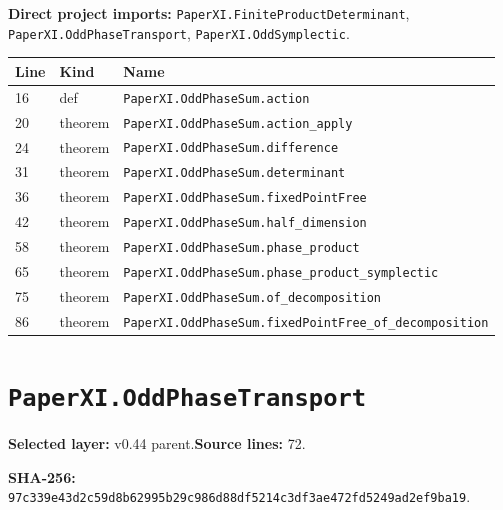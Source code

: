 \documentclass[10pt,oneside]{book}
\begin{document}

\textbf{Direct project imports:} \nolinkurl{PaperXI.FiniteProductDeterminant}, \nolinkurl{PaperXI.OddPhaseTransport}, \nolinkurl{PaperXI.OddSymplectic}.

\begin{longtable}{@{}p{}p{}p{}@{}}\toprule Line&Kind&Name\\\midrule\endhead

16&def&\nolinkurl{PaperXI.OddPhaseSum.action}\\

20&theorem&\nolinkurl{PaperXI.OddPhaseSum.action_apply}\\

24&theorem&\nolinkurl{PaperXI.OddPhaseSum.difference}\\

31&theorem&\nolinkurl{PaperXI.OddPhaseSum.determinant}\\

36&theorem&\nolinkurl{PaperXI.OddPhaseSum.fixedPointFree}\\

42&theorem&\nolinkurl{PaperXI.OddPhaseSum.half_dimension}\\

58&theorem&\nolinkurl{PaperXI.OddPhaseSum.phase_product}\\

65&theorem&\nolinkurl{PaperXI.OddPhaseSum.phase_product_symplectic}\\

75&theorem&\nolinkurl{PaperXI.OddPhaseSum.of_decomposition}\\

86&theorem&\nolinkurl{PaperXI.OddPhaseSum.fixedPointFree_of_decomposition}\\

\bottomrule\end{longtable}

\section{\texorpdfstring{\nolinkurl{PaperXI.OddPhaseTransport}}{PaperXI.OddPhaseTransport}}\label{module:PaperXI.OddPhaseTransport}

\textbf{Selected layer:} v0.44 parent.\quad\textbf{Source lines:} 72.\par\textbf{SHA-256:} {\scriptsize\nolinkurl{97c339e43d2c59d8b62995b29c986d88df5214c3df3ae472fd5249ad2ef9ba19}}.
\end{document}
